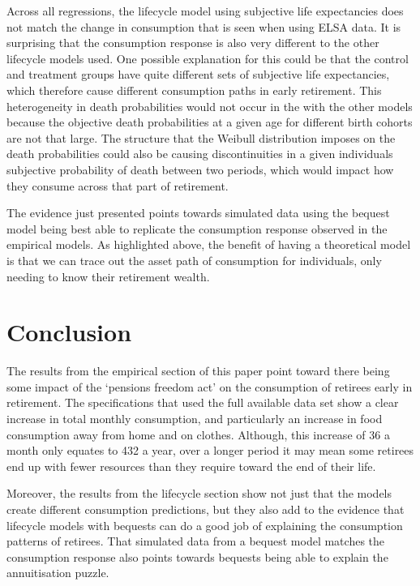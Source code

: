 \documentclass[12pt]{article}
\begin{document}
Across all regressions, the lifecycle model using subjective life expectancies
does not match the change in consumption that is seen when using ELSA data. It
is surprising that the consumption response is also very different to the other
lifecycle models used. One possible explanation for this could be that the
control and treatment groups have quite different sets of subjective life
expectancies, which therefore cause different consumption paths in early
retirement. This heterogeneity in death probabilities would not occur in the
with the other models because the objective death probabilities at a given age
for different birth cohorts are not that large. The structure that the Weibull
distribution imposes on the death probabilities could also be causing
discontinuities in a given individuals subjective probability of death between
two periods, which would impact how they consume across that part of retirement.

The evidence just presented points towards simulated data using the bequest
model being best able to replicate the consumption response observed in the
empirical models. As highlighted above, the benefit of having a theoretical
model is that we can trace out the asset path of consumption for individuals,
only needing to know their retirement wealth.

\section{Conclusion}

The results from the empirical section of this paper point toward there being
some impact of the `pensions freedom act' on the consumption of retirees early
in retirement. The specifications that used the full available data set show a
clear increase in total monthly consumption, and particularly an increase in food
consumption away from home and on clothes. Although, this increase of 36 a month
only equates to 432 a year, over a longer period it may mean some retirees end
up with fewer resources than they require toward the end of their life.

Moreover, the results from the lifecycle section show not just that the models
create different consumption predictions, but they also add to the evidence that
lifecycle models with bequests can do a good job of explaining the consumption
patterns of retirees. That simulated data from a bequest model matches the
consumption response also points towards bequests being able to explain the
annuitisation puzzle.
\end{document}
